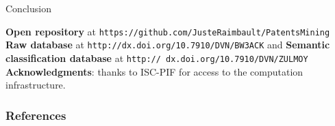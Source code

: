 \documentclass{beamer}
\begin{document}
\begin{frame}{Conclusion}



\bigskip

\textbf{Open repository} at \texttt{https://github.com/JusteRaimbault/PatentsMining}\\\smallskip
\textbf{Raw database} at \texttt{http://dx.doi.org/10.7910/DVN/BW3ACK} and \textbf{Semantic classification database} at  \texttt{http:// dx.doi.org/10.7910/DVN/ZULMOY}\\\smallskip
\textbf{Acknowledgments}: thanks to ISC-PIF for access to the computation infrastructure.

\end{frame}




\begin{frame}[allowframebreaks]
\frametitle{References}


\end{frame}
\end{document}
